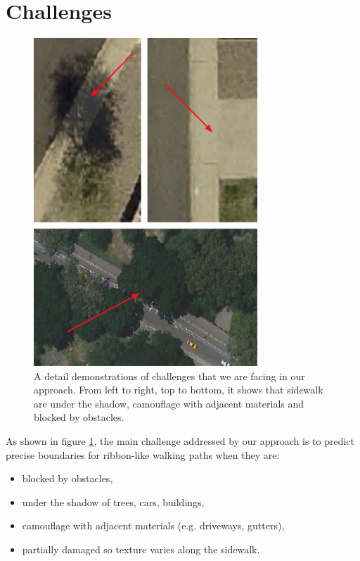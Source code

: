 \section{Challenges}

\begin{figure}[H]
    \centering
    \includegraphics[width=0.75\textwidth]{Figures/Challenge.png}
    \caption[Challenges Demonstration]{A detail demonstrations of challenges that we are facing in our approach. From left to right, top to bottom, it shows that sidewalk are under the shadow, camouflage with adjacent materials and blocked by obstacles.}
    \label{fig:challenge_demo}
\end{figure}

As shown in figure \ref{fig:challenge_demo}, the main challenge addressed by our approach is to predict precise boundaries for ribbon-like walking paths when they are:

\begin{itemize}
    \item blocked by obstacles,
    \item under the shadow of trees, cars, buildings,
    \item camouflage with adjacent materials (e.g. driveways, gutters),
    \item partially damaged so texture varies along the sidewalk.
\end{itemize}

